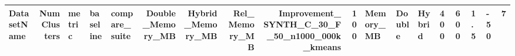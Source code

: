 \begin{tabular}{lrlllrrrrr}
\toprule
DatasetName & NumClusters & metric & baseline & compare_suite & Double_Memory_MB & Hybrid_Memory_MB & Rel_Memory_MB & Improvement_%
\midrule
SYNTH_C_30_F_50_n1000_000k_kmeans & 100 & Memory_MB & Double & Hybrid & 400 & 600 & 1.5 & -50 & 7 \\
\bottomrule
\end{tabular}
